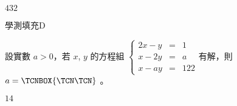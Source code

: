 \begin{QUESTIONS}
\begin{QUESTION}
\begin{QBODY}
        \end{QBODY}
        \begin{QFROMS}
        \end{QFROMS}
        \begin{QTAGS}\end{QTAGS}
        \begin{QANS}
            $432$
        \end{QANS}
        \begin{QSOLLIST}
        \end{QSOLLIST}
        \begin{QEMPTYSPACE}
        \end{QEMPTYSPACE}
    \end{QUESTION}
    \begin{QUESTION}
        \begin{ExamInfo}{99}{學測}{填充}{D}
        \end{ExamInfo}
        \begin{ExamAnsRateInfo}{41}{71}{42}{10}
        \end{ExamAnsRateInfo}
        \begin{QBODY}
            設實數 $a>0$，若 $x$, $y$ 的方程組 $\left\{ \begin{array}{rcl} 2x-y & = &1 \\ x-2y &=&a \\ x-ay &= & 122 \end{array}\right.$有解，則$a=\TCNBOX{\TCN\TCN}$ 。
        \end{QBODY}
        \begin{QFROMS}
        \end{QFROMS}
        \begin{QTAGS}\end{QTAGS}
        \begin{QANS}
            $14$
        \end{QANS}
        \begin{QSOLLIST}
        \end{QSOLLIST}
        \begin{QEMPTYSPACE}
        \end{QEMPTYSPACE}
    \end{QUESTION}

\end{QUESTIONS}
